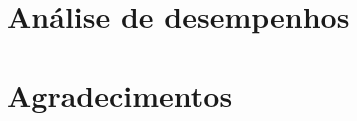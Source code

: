 \documentclass[12pt, a4paper]{report}
\begin{document}
	
	
	
	
	
	
	
	
	
	
	\chapter{Análise de desempenhos}
	\chapter*{Agradecimentos}
	
	
	
	 
\end{document}
